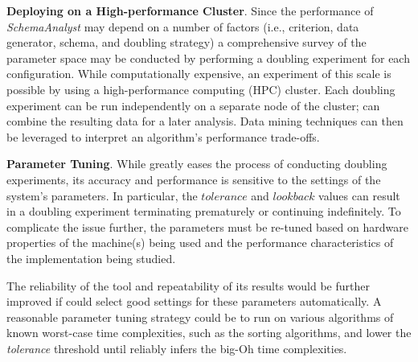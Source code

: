 

{\bf Deploying on a High-performance Cluster}.  Since the performance of
\textit{SchemaAnalyst} may depend on a number of factors (i.e., criterion, data
generator, schema, and doubling strategy) a comprehensive survey of the
parameter space may be conducted by performing a doubling experiment for each
configuration. While computationally expensive, an experiment of this scale is
possible by using a high-performance computing (HPC) cluster. Each doubling
experiment can be run independently on a separate node of the cluster;
\toolname can combine the resulting data for a later analysis. Data mining techniques
can then be leveraged to interpret an algorithm's performance trade-offs.

 {\bf Parameter Tuning}.  While \toolname greatly eases the process of
 conducting doubling experiments, its accuracy and performance is sensitive to
 the settings of the system's parameters.  In particular, the
 $\mathit{tolerance}$ and $\mathit{lookback}$ values can result in a doubling
 experiment terminating prematurely or continuing indefinitely.  To complicate
 the issue further, the parameters must be re-tuned based on hardware
 properties of the machine(s) being used and the performance characteristics of
 the implementation being studied.

  The reliability of the tool and repeatability of its results would be further
  improved if \toolname could select good settings for these parameters
  automatically. A reasonable parameter tuning strategy could be to run
  \toolname on various algorithms of known worst-case time complexities, such
  as the sorting algorithms, and lower the \textit{tolerance} threshold until
  \toolname reliably infers the big-Oh time complexities.

